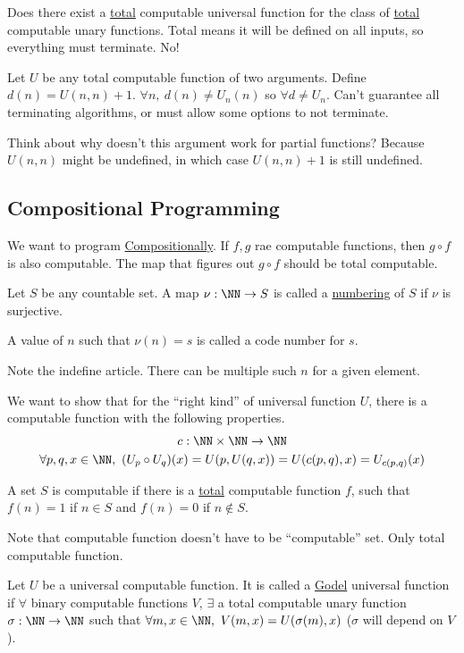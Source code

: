 \documentclass[../598comp.tex]{subfiles}
\begin{document}
Does there exist a \ul{total} computable universal function for the class of
\ul{total} computable unary functions. Total means it will be defined on all
inputs, so everything must terminate. No!

Let $U$ be any total computable function of two arguments. Define $d(n) = U(n,
n) + 1$. $\forall n, \ d(n) \neq U_n(n)$ so $\forall d \neq U_n$. Can't
guarantee all terminating algorithms, or must allow some options to not terminate.

Think about why doesn't this argument work for partial functions? Because $U(n,
n)$ might be undefined, in which case $U(n, n) + 1$ is still undefined.

\subsection{Compositional Programming}

We want to program \ul{Compositionally}. If $f, g$ rae computable functions,
then $g \circ f$ is also computable. The map that figures out $g \circ f$ should
be total computable.

\begin{definition}
  Let $S$ be any countable set. A map $\nu: \NN \to S$ is called a
  \ul{numbering} of $S$ if $\nu$ is surjective.

  A value of $n$ such that $\nu(n) = s$ is called a code number for $s$.

  Note the indefine article. There can be multiple such $n$ for a given element.

  We want to show that for the ``right kind'' of universal function $U$, there
  is a computable function with the following properties.
  \begin{gather*}
    c: \NN \times \NN \to \NN \\
    \forall p, q, x \in \NN, \ (U_p \circ U_q)(x) = U(p, U(q, x)) = U(c(p, q),
    x) = U_{c(p, q)}(x)
  \end{gather*}
\end{definition}

\begin{note}
  A set $S$ is computable if there is a \ul{total} computable function $f$, such
  that $f(n) = 1$ if $n \in S$ and $f(n) = 0$ if $n \notin S$.

  Note that computable function doesn't have to be ``computable'' set. Only total
  computable function.
\end{note}

\begin{definition}
  Let $U$ be a universal computable function. It is called a \ul{Godel}
  universal function if $\forall$ binary computable functions $V$, $\exists$ a
  total computable unary function $\sigma: \NN \to \NN$ such that $\forall m, x
  \in \NN, \ V(m, x) = U(\sigma(m), x)$ ($\sigma$ will depend on $V$).
\end{definition}
\end{document}

